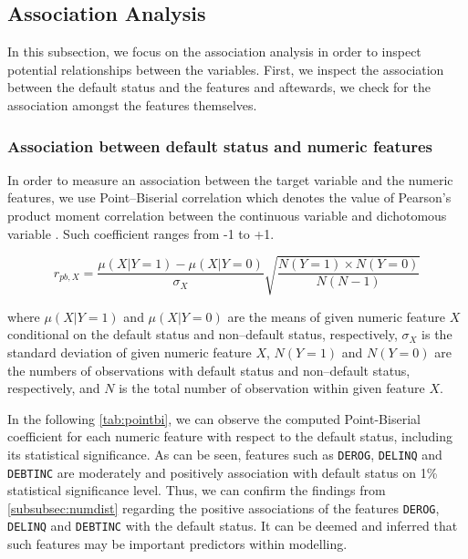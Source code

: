 \subsection{Association Analysis}
In this subsection, we focus on the association analysis in order to inspect potential relationships between the variables. First, we inspect the association between the default status and the features and aftewards, we check for the association amongst the features themselves.


\subsubsection{Association between default status and numeric features}
\label{subsubsec:target-num-ass}

In order to measure an association between the target variable and the numeric features, we use Point--Biserial correlation which denotes the value of Pearson's product moment correlation between the continuous variable and dichotomous variable \citep{kornbrot2014point}. Such coefficient ranges from -1 to +1.

\begin{equation}\label{eq}
    r_{pb,X} =  \frac{\mu \left( X | Y=1 \right) -\mu \left( X | Y=0 \right)}{\sigma_{X}}\sqrt{\frac{N\left(Y=1\right) \times N\left(Y=0\right)}{N \left(N - 1 \right)}}
\end{equation}

where $\mu \left( X | Y=1 \right)$ and $\mu \left( X | Y=0 \right)$ are the means of given numeric feature $X$ conditional on the default status and non--default status, respectively, $\sigma_{X}$ is the standard deviation of given numeric feature $X$, $N\left(Y=1\right)$ and $N\left(Y=0\right)$ are the numbers of observations with default status and non--default status, respectively, and $N$ is the total number of observation within given feature $X$.


In the following \autoref{tab:pointbi}, we can observe the computed Point-Biserial coefficient for each numeric feature with respect to the default status, including its statistical significance.
As can be seen, features such as \texttt{DEROG}, \texttt{DELINQ} and \texttt{DEBTINC} are moderately and positively association with default status on 1\% statistical significance level.
Thus, we can confirm the findings from \autoref{subsubsec:numdist} regarding the positive associations of the features \texttt{DEROG}, \texttt{DELINQ} and \texttt{DEBTINC} with the default status.
It can be deemed and inferred that such features may be important predictors within modelling.

